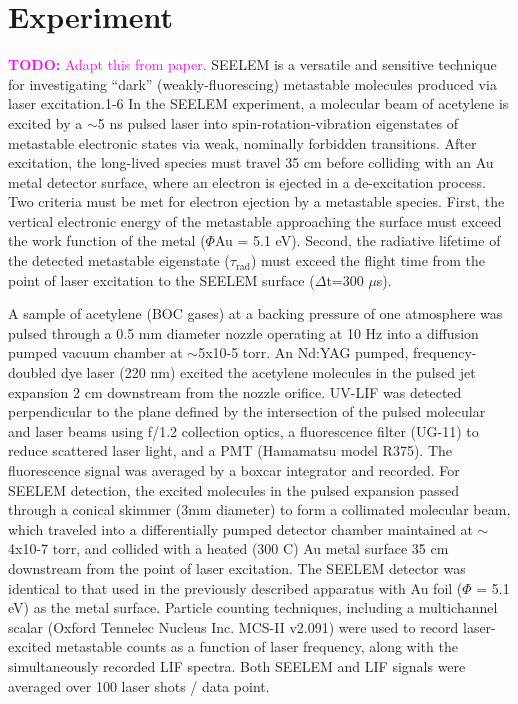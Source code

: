 \documentclass[12pt,draft]{mitthesis}
\newcommand{\TODO} [1]{\textcolor{magenta}{\textbf{TODO:} #1}}
\begin{document}
\section{Experiment}

\TODO{Adapt this from paper.}  SEELEM is a versatile and sensitive
technique for investigating ``dark'' (weakly-fluorescing) metastable
molecules produced via laser excitation.1-6 In the SEELEM experiment,
a molecular beam of acetylene is excited by a $\sim$5 ns pulsed laser
into spin-rotation-vibration eigenstates of metastable electronic
states via weak, nominally forbidden transitions. After excitation,
the long-lived species must travel 35 cm before colliding with an Au
metal detector surface, where an electron is ejected in a
de-excitation process. Two criteria must be met for electron ejection
by a metastable species. First, the vertical electronic energy of the
metastable approaching the surface must exceed the work function of
the metal ($\Phi$Au = 5.1 eV). Second, the radiative lifetime of the
detected metastable eigenstate ($\tau_\text{rad}$) must exceed the
flight time from the point of laser excitation to the SEELEM surface
($\Delta$t=300 $\mu$s).

A sample of acetylene (BOC gases) at a backing pressure of one
atmosphere was pulsed through a 0.5 mm diameter nozzle operating at 10
Hz into a diffusion pumped vacuum chamber at $\sim$5x10-5 torr.  An Nd:YAG
pumped, frequency-doubled dye laser (220 nm) excited the acetylene
molecules in the pulsed jet expansion 2 cm downstream from the nozzle
orifice. UV-LIF was detected perpendicular to the plane defined by the
intersection of the pulsed molecular and laser beams using f/1.2
collection optics, a fluorescence filter (UG-11) to reduce scattered
laser light, and a PMT (Hamamatsu model R375). The fluorescence signal
was averaged by a boxcar integrator and recorded. For SEELEM
detection, the excited molecules in the pulsed expansion passed
through a conical skimmer (3mm diameter) to form a collimated
molecular beam, which traveled into a differentially pumped detector
chamber maintained at $\sim$4x10-7 torr, and collided with a heated (300
C) Au metal surface 35 cm downstream from the point of laser
excitation. The SEELEM detector was identical to that used in the
previously described apparatus with Au foil ($\Phi$ = 5.1 eV) as the
metal surface.  Particle counting techniques, including a multichannel
scalar (Oxford Tennelec Nucleus Inc. MCS-II v2.091) were used to
record laser-excited metastable counts as a function of laser
frequency, along with the simultaneously recorded LIF spectra. Both
SEELEM and LIF signals were averaged over 100 laser shots / data
point.
\end{document}
